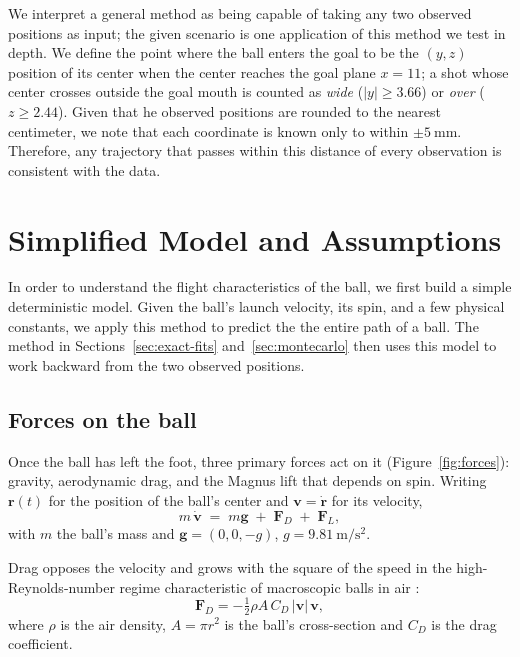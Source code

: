 \documentclass[10pt,a4paper]{article}
\begin{document}
We interpret a general method as being capable of
taking any two observed positions as input; the given scenario is one application of this method we test in depth. We define the point where the ball enters the goal to
be the $(y, z)$ position of its center when the center reaches the goal plane
$x = 11$; a shot whose center crosses outside the goal mouth is counted as
\emph{wide} ($|y| \geq 3.66$) or \emph{over} ($z \geq 2.44$). Given that he
observed positions are rounded to the nearest centimeter, we note that each coordinate is
known only to within $\pm\SI{5}{\milli\metre}$. Therefore, any trajectory that passes
within this distance of every observation is consistent with the data.

\section{Simplified Model and Assumptions}
\label{sec:simple-model}

In order to understand the flight characteristics of the ball, we first build a simple deterministic model. Given the ball's launch velocity, its
spin, and a few physical constants, we apply this method to predict the the entire path of a ball. The method in
Sections~\ref{sec:exact-fits} and~\ref{sec:montecarlo} then uses this model to work
backward from the two observed positions.

\subsection{Forces on the ball}
\label{sec:forces}

Once the ball has left the foot, three primary forces act on it
(Figure~\ref{fig:forces}): gravity, aerodynamic drag, and the Magnus lift that depends on spin. Writing $\bm{r}(t)$ for the position of the ball's center and
$\bm{v} = \dot{\bm{r}}$ for its velocity,
\begin{equation}
  m\,\dot{\bm{v}} \;=\; m\bm{g} \;+\; \bm{F}_D \;+\; \bm{F}_L ,
  \label{eq:eom}
\end{equation}
with $m$ the ball's mass and $\bm{g} = (0, 0, -g)$, $g = \SI{9.81}{\metre\per\second\squared}$.

Drag opposes the velocity and grows with the square of the
speed in the high-Reynolds-number regime characteristic of macroscopic balls in air \citep{timmerman1999}:
\begin{equation}
  \bm{F}_D = -\tfrac{1}{2}\rho A\, C_D\, |\bm{v}|\,\bm{v},
  \label{eq:drag}
\end{equation}
where $\rho$ is the air density, $A = \pi r^2$ is the ball's cross-section and
$C_D$ is the drag coefficient.
\end{document}
